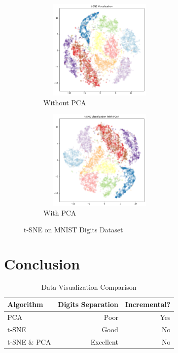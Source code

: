 \documentclass[twocolumn]{article}
\begin{document}
\begin{figure}[t!]
  \centering
  \begin{subfigure}[t]{0.5\textwidth}
    \centering
    \includegraphics[width=6cm, height=4.9cm]{tsne.png}
    \caption{Without PCA}
  \end{subfigure}
  \begin{subfigure}[t]{0.5\textwidth}
    \centering
    \includegraphics[width=6cm, height=4.9cm]{tsne_with_pca.png}
    \caption{With PCA}
  \end{subfigure}
  \caption{t-SNE on MNIST Digits Dataset}
  \label{fig:tsne}
\end{figure}

\section{Conclusion}

\begin{table}[hbt]
  \caption{Data Visualization Comparison}
  \begin{center}
    \begin{tabular}{l r r}
      \hline
      \textbf{Algorithm} & \textbf{Digits Separation} & \textbf{Incremental?} \\
      \hline
      PCA & Poor & Yes \\
      t-SNE & Good & No \\
      t-SNE \& PCA & Excellent & No \\
      \hline
    \end{tabular}
    \label{tbl:comparison}
  \end{center}
\end{table}
\end{document}
